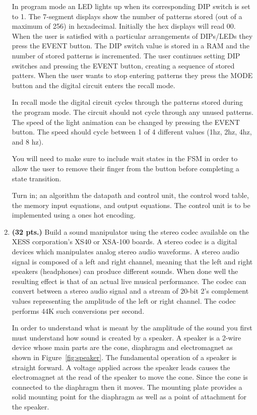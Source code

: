 \begin{enumerate}
In program mode an LED lights up when its corresponding DIP switch
is set to 1.   The 7-segment displays show the number of patterns
stored (out of a maximum of 256) in hexadecimal.  Initially
the hex displays will read 00.  When the user is satisfied with a 
particular arrangements of DIPs/LEDs they press the EVENT button.
The DIP switch value is stored in a RAM and the number of stored patterns
is incremented.  The user continues setting DIP switches and pressing
the EVENT button, creating a sequence of stored patters.  When the
user wants to stop entering patterns they press the MODE button and
the digital circuit enters the recall mode.

In recall mode the digital circuit cycles through the patterns
stored during the program mode.  The circuit should not cycle 
through any unused patterns.  The speed of the light animation
can be changed by pressing the EVENT button.  The speed should
cycle between 1 of 4 different values (1hz, 2hz, 4hz, and 8 hz).

You will need to make sure to include wait states in the FSM
in order to allow the user to remove their finger from the
button before completing a state transition.

Turn in; an algorithm
the datapath and control unit,
the control word table,
the memory input equations, and
output equations.
The control unit is to be implemented using a ones hot encoding.


\item \textbf{(32 pts.)}
Build a sound manipulator using the stereo codec available on the
XESS corporation's XS40 or XSA-100 boards.  A stereo codec is a digital
devices which manipulates analog stereo audio waveforms.  A stereo audio signal
is composed of a left and right channel, meaning that the left and right
speakers (headphones) can produce different sounds.  When done well the
resulting effect is that of an actual live
musical performance.  The codec can convert between a stereo audio signal 
and a stream of 20-bit 2's complement values representing the amplitude
of the left or right channel.  The codec performs 44K such conversions 
per second.
 
In order to understand what is meant by the amplitude of the sound you first
must understand how sound is created by a speaker.  A speaker is a 2-wire
device whose main parts are the cone, diaphragm and electromagnet as 
shown in Figure~\ref{fig:speaker}.  The fundamental operation of a speaker 
is straight forward.  A voltage applied across the speaker leads causes
the electromagnet at the read of the speaker to move the cone.  Since
the cone is connected to the diaphragm then it moves. The mounting 
plate provides a solid mounting point for the diaphragm as well as a point
of attachment for the speaker.


\end{enumerate}
